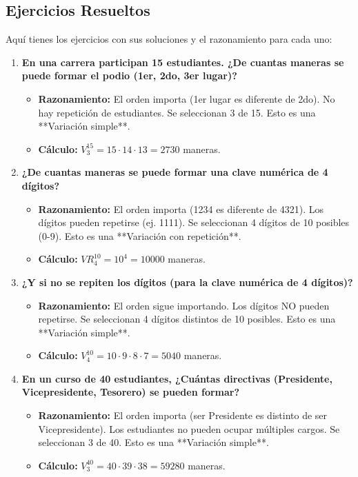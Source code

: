\documentclass[12pt, letterpaper]{article}
\begin{document}
\subsection*{Ejercicios Resueltos}
Aquí tienes los ejercicios con sus soluciones y el razonamiento para cada uno:

\begin{enumerate}[leftmargin=*,label=\arabic*.]
    \item \textbf{En una carrera participan 15 estudiantes. ¿De cuantas maneras se puede formar el podio (1er, 2do, 3er lugar)?}
    \begin{itemize}
        \item \textbf{Razonamiento:} El orden importa (1er lugar es diferente de 2do). No hay repetición de estudiantes. Se seleccionan 3 de 15. Esto es una **Variación simple**.
        \item \textbf{Cálculo:} $V_3^{15} = 15 \cdot 14 \cdot 13 = 2730$ maneras.
    \end{itemize}

    \item \textbf{¿De cuantas maneras se puede formar una clave numérica de 4 dígitos?}
    \begin{itemize}
        \item \textbf{Razonamiento:} El orden importa (1234 es diferente de 4321). Los dígitos pueden repetirse (ej. 1111). Se seleccionan 4 dígitos de 10 posibles (0-9). Esto es una **Variación con repetición**.
        \item \textbf{Cálculo:} $VR_4^{10} = 10^4 = 10000$ maneras.
    \end{itemize}

    \item \textbf{¿Y si no se repiten los dígitos (para la clave numérica de 4 dígitos)?}
    \begin{itemize}
        \item \textbf{Razonamiento:} El orden sigue importando. Los dígitos NO pueden repetirse. Se seleccionan 4 dígitos distintos de 10 posibles. Esto es una **Variación simple**.
        \item \textbf{Cálculo:} $V_4^{10} = 10 \cdot 9 \cdot 8 \cdot 7 = 5040$ maneras.
    \end{itemize}

    \item \textbf{En un curso de 40 estudiantes, ¿Cuántas directivas (Presidente, Vicepresidente, Tesorero) se pueden formar?}
    \begin{itemize}
        \item \textbf{Razonamiento:} El orden importa (ser Presidente es distinto de ser Vicepresidente). Los estudiantes no pueden ocupar múltiples cargos. Se seleccionan 3 de 40. Esto es una **Variación simple**.
        \item \textbf{Cálculo:} $V_3^{40} = 40 \cdot 39 \cdot 38 = 59280$ maneras.
    \end{itemize}


\end{enumerate}
\end{document}
